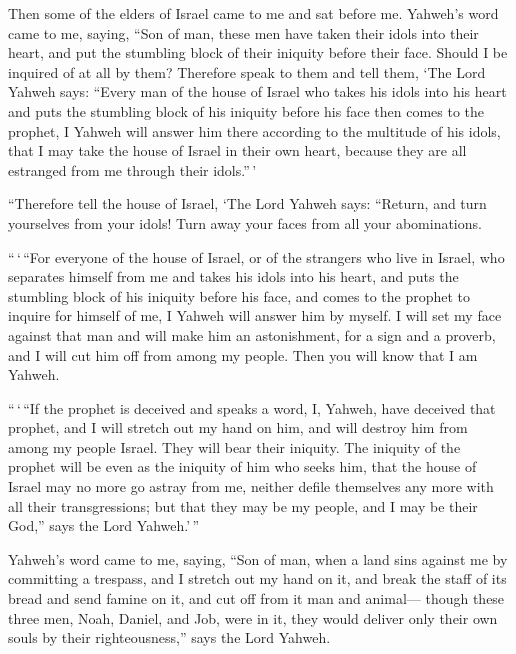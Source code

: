  Then some of the elders of Israel came to me and sat
before me.  Yahweh's word came to me, saying,
 ``Son of man, these men have taken their idols into their
heart, and put the stumbling block of their iniquity before their face.
Should I be inquired of at all by them?  Therefore speak
to them and tell them, `The Lord Yahweh says: ``Every man of the house
of Israel who takes his idols into his heart and puts the stumbling
block of his iniquity before his face then comes to the prophet, I
Yahweh will answer him there according to the multitude of his idols,
 that I may take the house of Israel in their own heart,
because they are all estranged from me through their idols.''\,'

 ``Therefore tell the house of Israel, `The Lord Yahweh
says: ``Return, and turn yourselves from your idols! Turn away your
faces from all your abominations.

 ``\,`\,``For everyone of the house of Israel, or of the
strangers who live in Israel, who separates himself from me and takes
his idols into his heart, and puts the stumbling block of his iniquity
before his face, and comes to the prophet to inquire for himself of me,
I Yahweh will answer him by myself.  I will set my face
against that man and will make him an astonishment, for a sign and a
proverb, and I will cut him off from among my people. Then you will know
that I am Yahweh.

 ``\,`\,``If the prophet is deceived and speaks a word, I,
Yahweh, have deceived that prophet, and I will stretch out my hand on
him, and will destroy him from among my people Israel. 
They will bear their iniquity. The iniquity of the prophet will be even
as the iniquity of him who seeks him,  that the house of
Israel may no more go astray from me, neither defile themselves any more
with all their transgressions; but that they may be my people, and I may
be their God,'' says the Lord Yahweh.'\,''

 Yahweh's word came to me, saying,  ``Son
of man, when a land sins against me by committing a trespass, and I
stretch out my hand on it, and break the staff of its bread and send
famine on it, and cut off from it man and animal--- 
though these three men, Noah, Daniel, and Job, were in it, they would
deliver only their own souls by their righteousness,'' says the Lord
Yahweh.

